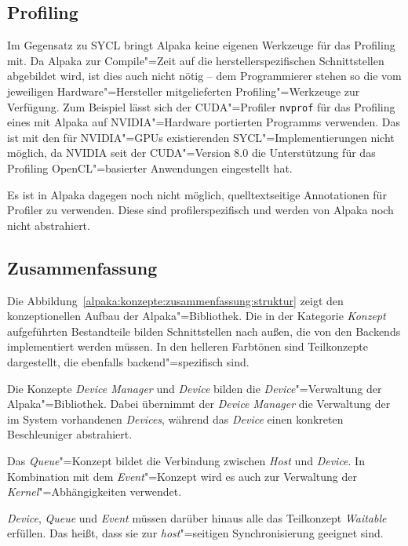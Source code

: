 \subsection{Profiling}

Im Gegensatz zu SYCL bringt Alpaka keine eigenen Werkzeuge für das Profiling
mit. Da Alpaka zur Compile"=Zeit auf die herstellerspezifischen Schnittstellen
abgebildet wird, ist dies auch nicht nötig -- dem Programmierer stehen so die
vom jeweiligen Hardware"=Hersteller mitgelieferten Profiling"=Werkzeuge zur
Verfügung. Zum Beispiel lässt sich der CUDA"=Profiler \texttt{nvprof} für
das Profiling eines mit Alpaka auf NVIDIA"=Hardware portierten Programms
verwenden. Das ist mit den für NVIDIA"=GPUs existierenden
SYCL"=Implementierungen nicht möglich, da NVIDIA seit der CUDA"=Version 8.0 die
Unterstützung für das Profiling OpenCL"=basierter Anwendungen eingestellt hat.

Es ist in Alpaka dagegen noch nicht möglich, quelltextseitige Annotationen für
Profiler zu verwenden. Diese sind profilerspezifisch und werden von Alpaka noch
nicht abstrahiert.

\subsection{Zusammenfassung}

Die Abbildung~\ref{alpaka:konzepte:zusammenfassung:struktur} zeigt den
konzeptionellen Aufbau der Alpaka"=Bibliothek. Die in der Kategorie
\textit{Konzept} aufgeführten Bestandteile bilden Schnittstellen nach außen, die
von den Backends implementiert werden müssen. In den helleren Farbtönen sind
Teilkonzepte dargestellt, die ebenfalls backend"=spezifisch sind.

Die Konzepte \textit{Device Manager} und \textit{Device} bilden die
\textit{Device}"=Verwaltung der Alpaka"=Bibliothek. Dabei übernimmt der
\textit{Device Manager} die Verwaltung der im System vorhandenen
\textit{Devices}, während das \textit{Device} einen konkreten Beschleuniger
abstrahiert.

Das \textit{Queue}"=Konzept bildet die Verbindung zwischen \textit{Host} und
\textit{Device}. In Kombination mit dem \textit{Event}"=Konzept wird es auch
zur Verwaltung der \textit{Kernel}"=Abhängigkeiten verwendet.

\textit{Device}, \textit{Queue} und \textit{Event} müssen darüber hinaus alle
das Teilkonzept \textit{Waitable} erfüllen. Das heißt, dass sie zur
\textit{host}"=seitigen Synchronisierung geeignet sind.

